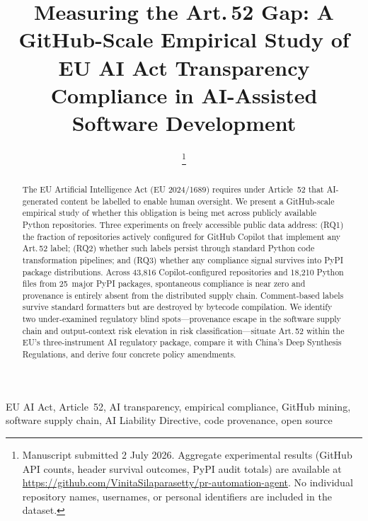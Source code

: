 \documentclass[conference]{IEEEtran}
\begin{document}
\title{Measuring the Art.\,52 Gap: A GitHub-Scale Empirical Study of EU AI Act
Transparency Compliance in AI-Assisted Software Development}

\author{%
  \thanks{Manuscript submitted 2 July 2026.
    Aggregate experimental results (GitHub API counts, header survival
    outcomes, PyPI audit totals) are available at
    \url{https://github.com/VinitaSilaparasetty/pr-automation-agent}.
    No individual repository names, usernames, or personal identifiers
    are included in the dataset.}
}

\maketitle

\begin{abstract}
The EU Artificial Intelligence Act (EU 2024/1689) requires under
Article~52 that AI-generated content be labelled to enable human
oversight.  We present a GitHub-scale empirical study of whether this
obligation is being met across publicly available Python repositories.
Three experiments on freely accessible public data address: (RQ1) the
fraction of repositories actively configured for GitHub Copilot that
implement any Art.\,52 label; (RQ2) whether such labels persist through
standard Python code transformation pipelines; and (RQ3) whether any
compliance signal survives into PyPI package distributions.  Across
43,816 Copilot-configured repositories and 18,210 Python files from
25~major PyPI packages, spontaneous compliance is near zero and
provenance is entirely absent from the distributed supply chain.
Comment-based labels survive standard formatters but are destroyed by
bytecode compilation.  We identify two under-examined regulatory blind
spots---provenance escape in the software supply chain and output-context
risk elevation in risk classification---situate Art.\,52 within the
EU's three-instrument AI regulatory package, compare it with China's
Deep Synthesis Regulations, and derive four concrete policy amendments.
\end{abstract}

\begin{IEEEkeywords}
EU AI Act, Article~52, AI transparency, empirical compliance, GitHub
mining, software supply chain, AI Liability Directive, code provenance,
open source
\end{IEEEkeywords}
\end{document}
